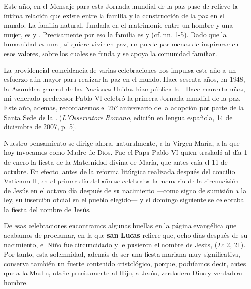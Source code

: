 \begin{body}
\begin{body}
Este año, en el Mensaje para esta Jornada mundial de la paz puse de relieve la íntima relación que existe entre la familia y la construcción de la paz en el mundo. La familia natural, fundada en el matrimonio entre un hombre y una mujer, es  y . Precisamente por eso la familia es  y  (cf. nn. 1-5). Dado que la humanidad es una , si quiere vivir en paz, no puede por menos de inspirarse en esos valores, sobre los cuales se funda y se apoya la comunidad familiar.

La providencial coincidencia de varias celebraciones nos impulsa este año a un esfuerzo aún mayor para realizar la paz en el mundo. Hace sesenta años, en 1948, la Asamblea general de las Naciones Unidas hizo pública la . Hace cuarenta años, mi venerado predecesor Pablo VI celebró la primera Jornada mundial de la paz. Este año, además, recordaremos el 25° aniversario de la adopción por parte de la Santa Sede de la .  (\emph{L'Osservatore Romano}, edición en lengua española, 14 de diciembre de 2007, p. 5).

Nuestro pensamiento se dirige ahora, naturalmente, a la Virgen María, a la que hoy invocamos como Madre de Dios. Fue el Papa Pablo VI quien trasladó al día 1 de enero la fiesta de la Maternidad divina de María, que antes caía el 11 de octubre. En efecto, antes de la reforma litúrgica realizada después del concilio Vaticano II, en el primer día del año se celebraba la memoria de la circuncisión de Jesús en el octavo día después de su nacimiento ---como signo de sumisión a la ley, su inserción oficial en el pueblo elegido--- y el domingo siguiente se celebraba la fiesta del nombre de Jesús.

De esas celebraciones encontramos algunas huellas en la página evangélica que acabamos de proclamar, en la que \textbf{san Lucas} refiere que, ocho días después de su nacimiento, el Niño fue circuncidado y le pusieron el nombre de Jesús,  (\emph{Lc} 2, 21). Por tanto, esta solemnidad, además de ser una fiesta mariana muy significativa, conserva también un fuerte contenido cristológico, porque, podríamos decir, antes que a la Madre, atañe precisamente al Hijo, a Jesús, verdadero Dios y verdadero hombre.


\end{body}
\end{body}
